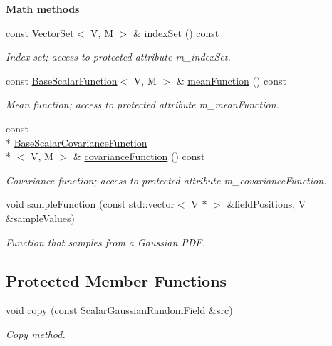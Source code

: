 \begin{Indent}{\bf Math methods}\par
\begin{DoxyCompactItemize}
\item 
const \hyperlink{class_q_u_e_s_o_1_1_vector_set}{Vector\-Set}$<$ V, M $>$ \& \hyperlink{class_q_u_e_s_o_1_1_scalar_gaussian_random_field_ac4edd4b4742e09be69e8f0aab3ecb6c6}{index\-Set} () const 
\begin{DoxyCompactList}\small\item\em Index set; access to protected attribute m\-\_\-index\-Set. \end{DoxyCompactList}\item 
const \hyperlink{class_q_u_e_s_o_1_1_base_scalar_function}{Base\-Scalar\-Function}$<$ V, M $>$ \& \hyperlink{class_q_u_e_s_o_1_1_scalar_gaussian_random_field_ac2421f1e67dc7a0052cdebfaf464421e}{mean\-Function} () const 
\begin{DoxyCompactList}\small\item\em Mean function; access to protected attribute m\-\_\-mean\-Function. \end{DoxyCompactList}\item 
const \\*
\hyperlink{class_q_u_e_s_o_1_1_base_scalar_covariance_function}{Base\-Scalar\-Covariance\-Function}\\*
$<$ V, M $>$ \& \hyperlink{class_q_u_e_s_o_1_1_scalar_gaussian_random_field_a3b8e2cce1f6fff8383de2325dc2981b5}{covariance\-Function} () const 
\begin{DoxyCompactList}\small\item\em Covariance function; access to protected attribute m\-\_\-covariance\-Function. \end{DoxyCompactList}\item 
void \hyperlink{class_q_u_e_s_o_1_1_scalar_gaussian_random_field_aea3e501fbf8ece28702666138f0eb8e0}{sample\-Function} (const std\-::vector$<$ V $\ast$ $>$ \&field\-Positions, V \&sample\-Values)
\begin{DoxyCompactList}\small\item\em Function that samples from a Gaussian P\-D\-F. \end{DoxyCompactList}\end{DoxyCompactItemize}
\end{Indent}
\subsection*{Protected Member Functions}
\begin{DoxyCompactItemize}
\item 
void \hyperlink{class_q_u_e_s_o_1_1_scalar_gaussian_random_field_a40ea0ed2c0011577bd17a7bcfaa9dfa6}{copy} (const \hyperlink{class_q_u_e_s_o_1_1_scalar_gaussian_random_field}{Scalar\-Gaussian\-Random\-Field} \&src)
\begin{DoxyCompactList}\small\item\em Copy method. \end{DoxyCompactList}\end{DoxyCompactItemize}

